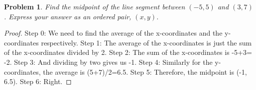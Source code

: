 \documentclass{article}
\newtheorem{theorem}{Problem}
\begin{document}
\begin{theorem}
Find the midpoint of the line segment between $(-5,5)$ and $(3,7)$. Express your answer as an ordered pair, $(x,y)$.
\end{theorem}

\begin{proof}
Step 0: We need to find the average of the x-coordinates and the y-coordinates respectively.
Step 1: The average of the x-coordinates is just the sum of the x-coordinates divided by 2.
Step 2: The sum of the x-coordinates is -5+3= -2.
Step 3: And dividing by two gives us -1.
Step 4: Similarly for the y-coordinates, the average is (5+7)/2=6.5.
Step 5: Therefore, the midpoint is (-1, 6.5).
Step 6: Right.
\end{proof}
\end{document}
